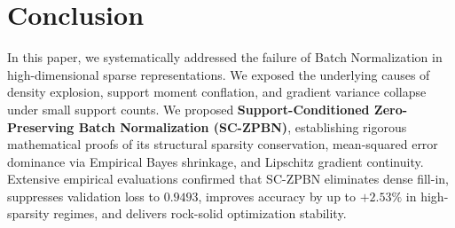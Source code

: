 \documentclass[twocolumn,10pt]{article}
\begin{document}
\section{Conclusion}
\label{sec:conclusion}

In this paper, we systematically addressed the failure of Batch Normalization in high-dimensional sparse representations. We exposed the underlying causes of density explosion, support moment conflation, and gradient variance collapse under small support counts. We proposed \textbf{Support-Conditioned Zero-Preserving Batch Normalization (SC-ZPBN)}, establishing rigorous mathematical proofs of its structural sparsity conservation, mean-squared error dominance via Empirical Bayes shrinkage, and Lipschitz gradient continuity. Extensive empirical evaluations confirmed that SC-ZPBN eliminates dense fill-in, suppresses validation loss to $\mathbf{0.9493}$, improves accuracy by up to $\mathbf{+2.53\%}$ in high-sparsity regimes, and delivers rock-solid optimization stability.



\end{document}
